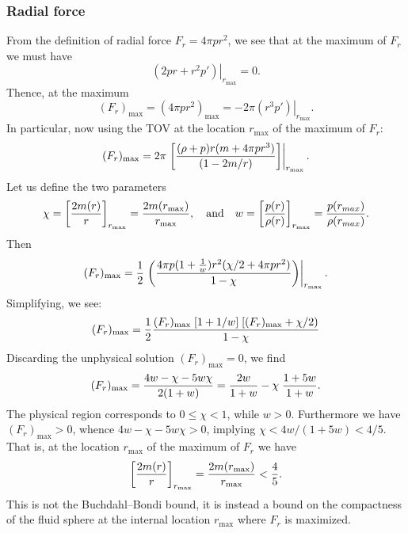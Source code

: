 \documentclass[12pt]{article}
\begin{document}
\subsubsection{Radial force}
From the definition of radial force $F_r = 4\pi p r^2$, we see that at the maximum  of $F_r$ we must have 
\begin{equation}
\left.(2 p r + r^2 p')\right|_{r_\mathrm{max}}=0.
\end{equation}
Thence, at the maximum
\begin{equation}
(F_r)_\mathrm{max} = (4\pi p r^2)_\mathrm{max} = -2\pi \left.(r^3 p')\right|_{r_\mathrm{max}}.
\end{equation}
In particular, now using the TOV at the location $r_\mathrm{max}$ of the maximum  of $F_r$:
\begin{equation}
(F_r)_\mathrm{max} = 
2\pi \left.\left[ {(\rho+p) r(m +4\pi p r^3)\over (1-2m/r)}\right]\right|_{r_\mathrm{max}}.
\end{equation}
Let us define the two parameters 
\begin{equation}
\chi=\left[2m(r)\over r\right]_{r_\mathrm{max}}={2m(r_\mathrm{max})\over r_\mathrm{max}},
\quad\hbox{and}\quad
w = \left[p(r)\over\rho(r)\right]_{r_\mathrm{max}}= {p(r_{max})\over\rho(r_{max})}.
\end{equation}
Then
\begin{equation}
(F_r)_\mathrm{max}  = 
{1\over2} \left.\left({4\pi p (1+{1\over w}) r^2(\chi/2 +4\pi p r^2)\over 1-\chi}\right)\right|_{r_\mathrm{max}}.
\end{equation}
Simplifying, we see:
\begin{equation}
(F_r)_\mathrm{max}  = 
{1\over2} {(F_r)_\mathrm{max}\; [1+1/w]\; [(F_r)_\mathrm{max}+\chi/2)\over 1-\chi}
\end{equation}
Discarding the unphysical solution $(F_r)_\mathrm{max}  = 0$, we find
\begin{equation}
(F_r)_\mathrm{max}  = {4w -\chi-5w\chi\over2(1+w)} = {2w\over1+w} - \chi \;{1+5w\over1+w}.
\end{equation}
The physical region corresponds to $0\leq \chi <1$, while $w>0$.  Furthermore we have  $(F_r)_\mathrm{max} >0$, whence $4w -\chi-5w\chi>0$, implying $\chi < 4w/(1+5w) < 4/5$. That is, at the location $r_\mathrm{max}$  of the maximum of $F_r$ we have
\begin{equation}
\left[2m(r)\over r\right]_{r_\mathrm{max}}  = {2m(r_\mathrm{max})\over r_\mathrm{max}} < {4\over5}.
\end{equation}
This is not the Buchdahl--Bondi bound, it is instead a bound on the compactness of the fluid sphere at the internal location $r_\mathrm{max}$ where $F_r$ is maximized.
\end{document}

